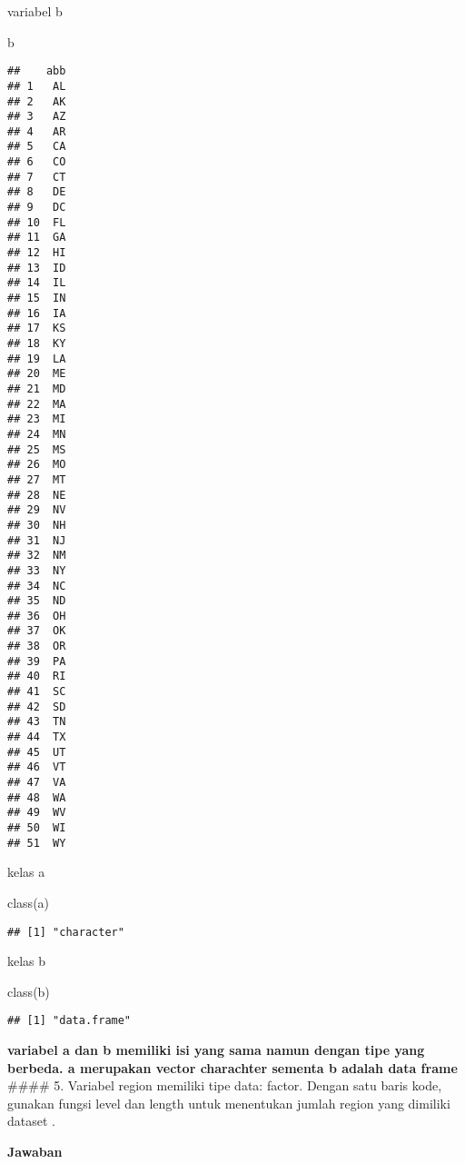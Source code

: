 \documentclass[
]{article}
\newenvironment{Shaded}{\begin{snugshade}}{\end{snugshade}}
\newcommand{\FunctionTok}[1]{\textcolor[rgb]{0.00,0.00,0.00}{#1}}
\newcommand{\NormalTok}[1]{#1}
\newcommand{\SpecialCharTok}[1]{\textcolor[rgb]{0.00,0.00,0.00}{#1}}
\begin{document}
variabel b

\begin{Shaded}
\begin{Highlighting}[]
\NormalTok{b}
\end{Highlighting}
\end{Shaded}

\begin{verbatim}
##    abb
## 1   AL
## 2   AK
## 3   AZ
## 4   AR
## 5   CA
## 6   CO
## 7   CT
## 8   DE
## 9   DC
## 10  FL
## 11  GA
## 12  HI
## 13  ID
## 14  IL
## 15  IN
## 16  IA
## 17  KS
## 18  KY
## 19  LA
## 20  ME
## 21  MD
## 22  MA
## 23  MI
## 24  MN
## 25  MS
## 26  MO
## 27  MT
## 28  NE
## 29  NV
## 30  NH
## 31  NJ
## 32  NM
## 33  NY
## 34  NC
## 35  ND
## 36  OH
## 37  OK
## 38  OR
## 39  PA
## 40  RI
## 41  SC
## 42  SD
## 43  TN
## 44  TX
## 45  UT
## 46  VT
## 47  VA
## 48  WA
## 49  WV
## 50  WI
## 51  WY
\end{verbatim}

kelas a

\begin{Shaded}
\begin{Highlighting}[]
\FunctionTok{class}\NormalTok{(a)}
\end{Highlighting}
\end{Shaded}

\begin{verbatim}
## [1] "character"
\end{verbatim}

kelas b

\begin{Shaded}
\begin{Highlighting}[]
\FunctionTok{class}\NormalTok{(b)}
\end{Highlighting}
\end{Shaded}

\begin{verbatim}
## [1] "data.frame"
\end{verbatim}

\textbf{variabel a dan b memiliki isi yang sama namun dengan tipe yang
berbeda. a merupakan vector charachter sementa b adalah data frame}
\#\#\#\# 5. Variabel region memiliki tipe data: factor. Dengan satu
baris kode, gunakan fungsi level dan length untuk menentukan jumlah
region yang dimiliki dataset .

\textbf{Jawaban}

\begin{Shaded}
\end{Shaded}
\end{document}
